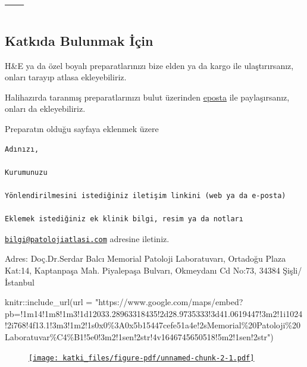 \documentclass[
  letterpaper,
  DIV=11,
  numbers=noendperiod]{scrreprt}
\newenvironment{Shaded}{}{}
\newcommand{\AttributeTok}[1]{\textcolor[rgb]{0.84,0.23,0.29}{#1}}
\newcommand{\FunctionTok}[1]{\textcolor[rgb]{0.44,0.26,0.76}{#1}}
\newcommand{\NormalTok}[1]{\textcolor[rgb]{0.14,0.16,0.18}{#1}}
\newcommand{\SpecialCharTok}[1]{\textcolor[rgb]{0.00,0.36,0.77}{#1}}
\newcommand{\StringTok}[1]{\textcolor[rgb]{0.01,0.18,0.38}{#1}}
\begin{document}
\part{---}

\cleardoublepage
{}
{}
\appendix

\hypertarget{sec-katki}{%
\chapter{Katkıda Bulunmak İçin}\label{sec-katki}}

H\&E ya da özel boyalı preparatlarınızı bize elden ya da kargo ile
ulaştırırsanız, onları tarayıp atlasa ekleyebiliriz.

Halihazırda taranmış preparatlarınızı bulut üzerinden
\href{mailto:bilgi@patolojiatlasi.com}{eposta} ile paylaşırsanız, onları
da ekleyebiliriz.

Preparatın olduğu sayfaya eklenmek üzere

\begin{verbatim}
Adınızı,

Kurumunuzu

Yönlendirilmesini istediğiniz iletişim linkini (web ya da e-posta)

Eklemek istediğiniz ek klinik bilgi, resim ya da notları
\end{verbatim}

\href{mailto:bilgi@patolojiatlasi.com}{\nolinkurl{bilgi@patolojiatlasi.com}}
adresine iletiniz.

Adres: Doç.Dr.Serdar Balcı Memorial Patoloji Laboratuvarı, Ortadoğu
Plaza Kat:14, Kaptanpaşa Mah. Piyalepaşa Bulvarı, Okmeydanı Cd No:73,
34384 Şişli/İstanbul

\begin{Shaded}
\begin{Highlighting}[]
\NormalTok{knitr}\SpecialCharTok{::}\FunctionTok{include\_url}\NormalTok{(}\AttributeTok{url =} \StringTok{"https://www.google.com/maps/embed?pb=!1m14!1m8!1m3!1d12033.28963318435!2d28.9735333!3d41.0619447!3m2!1i1024!2i768!4f13.1!3m3!1m2!1s0x0\%3A0x5b15447cefe51a4e!2sMemorial\%20Patoloji\%20Laboratuvar\%C4\%B1!5e0!3m2!1sen!2str!4v1646745650518!5m2!1sen!2str"}\NormalTok{)}
\end{Highlighting}
\end{Shaded}

\begin{figure}[H]

{\centering 

\href{https://www.google.com/maps/embed?pb=!1m14!1m8!1m3!1d12033.28963318435!2d28.9735333!3d41.0619447!3m2!1i1024!2i768!4f13.1!3m3!1m2!1s0x0\%3A0x5b15447cefe51a4e!2sMemorial\%20Patoloji\%20Laboratuvar\%C4\%B1!5e0!3m2!1sen!2str!4v1646745650518!5m2!1sen!2str}{\texttt{[image: katki\_files/figure-pdf/unnamed-chunk-2-1.pdf]}}

}

\end{figure}
\end{document}
